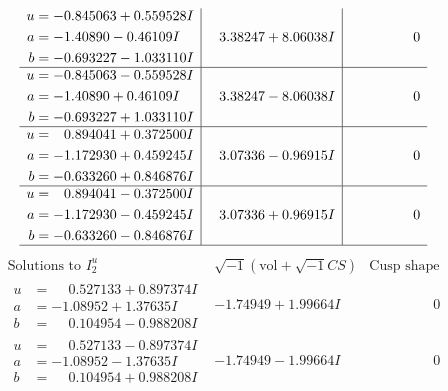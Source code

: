 \documentclass[1p]{elsarticle_modified}
\theoremstyle{definition}
\newcommand{\I}{\sqrt{-1}}
\begin{document}
$$\begin{array}{c|c|c}
\begin{aligned}
u &= -0.845063 + 0.559528 I \\
a &= -1.40890 - 0.46109 I \\
b &= -0.693227 - 1.033110 I\end{aligned}
 & \phantom{-}3.38247 + 8.06038 I & \phantom{-0.000000 } 0 \\ \hline\begin{aligned}
u &= -0.845063 - 0.559528 I \\
a &= -1.40890 + 0.46109 I \\
b &= -0.693227 + 1.033110 I\end{aligned}
 & \phantom{-}3.38247 - 8.06038 I & \phantom{-0.000000 } 0 \\ \hline\begin{aligned}
u &= \phantom{-}0.894041 + 0.372500 I \\
a &= -1.172930 + 0.459245 I \\
b &= -0.633260 + 0.846876 I\end{aligned}
 & \phantom{-}3.07336 - 0.96915 I & \phantom{-0.000000 } 0 \\ \hline\begin{aligned}
u &= \phantom{-}0.894041 - 0.372500 I \\
a &= -1.172930 - 0.459245 I \\
b &= -0.633260 - 0.846876 I\end{aligned}
 & \phantom{-}3.07336 + 0.96915 I & \phantom{-0.000000 } 0\\
 \hline 
 \end{array}$$\newpage$$\begin{array}{c|c|c}  
\text{Solutions to }I^u_{2}& \I (\text{vol} + \sqrt{-1}CS) & \text{Cusp shape}\\
 \hline 
\begin{aligned}
u &= \phantom{-}0.527133 + 0.897374 I \\
a &= -1.08952 + 1.37635 I \\
b &= \phantom{-}0.104954 - 0.988208 I\end{aligned}
 & -1.74949 + 1.99664 I & \phantom{-0.000000 } 0 \\ \hline\begin{aligned}
u &= \phantom{-}0.527133 - 0.897374 I \\
a &= -1.08952 - 1.37635 I \\
b &= \phantom{-}0.104954 + 0.988208 I\end{aligned}
 & -1.74949 - 1.99664 I & \phantom{-0.000000 } 0 \\ \hline\begin{aligned}

\end{aligned}
\end{array}$$
\end{document}
